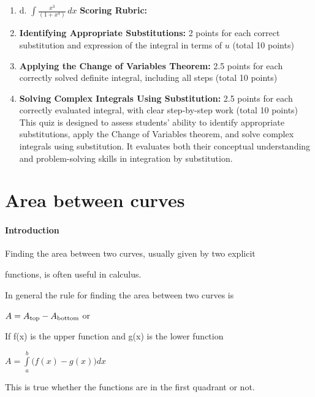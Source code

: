 \begin{enumerate}
    \item d. $\int \frac{x^3}{(1 + x^4)} \, dx$ \textbf{Scoring Rubric:}
    \item \textbf{Identifying Appropriate Substitutions:} 2 points for each correct substitution and expression of the integral in terms of $u$ (total 10 points)
    \item \textbf{Applying the Change of Variables Theorem:} 2.5 points for each correctly solved definite integral, including all steps (total 10 points)
    \item \textbf{Solving Complex Integrals Using Substitution:} 2.5 points for each correctly evaluated integral, with clear step-by-step work (total 10 points) This quiz is designed to assess students' ability to identify appropriate substitutions, apply the Change of Variables theorem, and solve complex integrals using substitution. It evaluates both their conceptual understanding and problem-solving skills in integration by substitution.
\end{enumerate}

\section{Area between curves}
\label{sec:area-between-curves}

\paragraph{Introduction}



Finding the area between two curves, usually given by two explicit

functions, is often useful in calculus.



In general the rule for finding the area between two curves is



$A=A _{\rm top}-A _{\rm bottom}$ or



If f(x) is the upper function and g(x) is the lower function



$A=\int\limits_a^b \bigl(f(x)-g(x)\bigr)dx$



This is true whether the functions are in the first quadrant or not.




